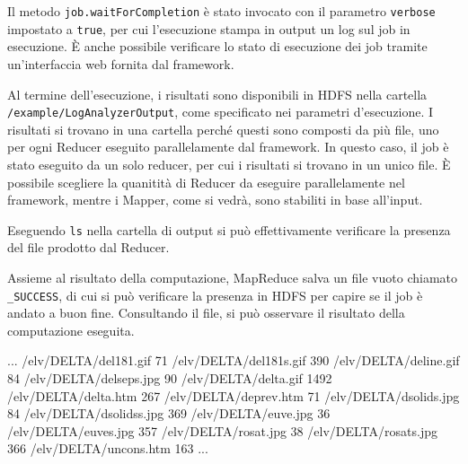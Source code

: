 \documentclass[italian,a4paper, twoside, 12pt]{report}
\newenvironment{Shaded}{}{}
\newcommand{\ExtensionTok}[1]{#1}
\newcommand{\NormalTok}[1]{#1}
\begin{document}
Il metodo \texttt{job.waitForCompletion} è stato invocato con il
parametro \texttt{verbose} impostato a \texttt{true}, per cui
l'esecuzione stampa in output un log sul job in esecuzione. È anche
possibile verificare lo stato di esecuzione dei job tramite
un'interfaccia web fornita dal framework.

Al termine dell'esecuzione, i risultati sono disponibili in HDFS nella
cartella \texttt{/example/LogAnalyzerOutput}, come specificato nei
parametri d'esecuzione. I risultati si trovano in una cartella perché
questi sono composti da più file, uno per ogni Reducer eseguito
parallelamente dal framework. In questo caso, il job è stato eseguito da
un solo reducer, per cui i risultati si trovano in un unico file. È
possibile scegliere la quanitità di Reducer da eseguire parallelamente
nel framework, mentre i Mapper, come si vedrà, sono stabiliti in base
all'input.

Eseguendo \texttt{ls} nella cartella di output si può effettivamente
verificare la presenza del file prodotto dal Reducer.

\begin{Shaded}
\end{Shaded}

Assieme al risultato della computazione, MapReduce salva un file vuoto
chiamato \texttt{\_SUCCESS}, di cui si può verificare la presenza in
HDFS per capire se il job è andato a buon fine. Consultando il file, si
può osservare il risultato della computazione eseguita.

\begin{Shaded}
\begin{Highlighting}[]
\ExtensionTok{...}
\ExtensionTok{/elv/DELTA/del181.gif}\NormalTok{   71}
\ExtensionTok{/elv/DELTA/del181s.gif}\NormalTok{  390}
\ExtensionTok{/elv/DELTA/deline.gif}\NormalTok{   84}
\ExtensionTok{/elv/DELTA/delseps.jpg}\NormalTok{  90}
\ExtensionTok{/elv/DELTA/delta.gif}\NormalTok{    1492}
\ExtensionTok{/elv/DELTA/delta.htm}\NormalTok{    267}
\ExtensionTok{/elv/DELTA/deprev.htm}\NormalTok{   71}
\ExtensionTok{/elv/DELTA/dsolids.jpg}\NormalTok{  84}
\ExtensionTok{/elv/DELTA/dsolidss.jpg}\NormalTok{ 369}
\ExtensionTok{/elv/DELTA/euve.jpg}\NormalTok{     36}
\ExtensionTok{/elv/DELTA/euves.jpg}\NormalTok{    357}
\ExtensionTok{/elv/DELTA/rosat.jpg}\NormalTok{    38}
\ExtensionTok{/elv/DELTA/rosats.jpg}\NormalTok{   366}
\ExtensionTok{/elv/DELTA/uncons.htm}\NormalTok{   163}
\ExtensionTok{...}
\end{Highlighting}
\end{Shaded}
\end{document}
